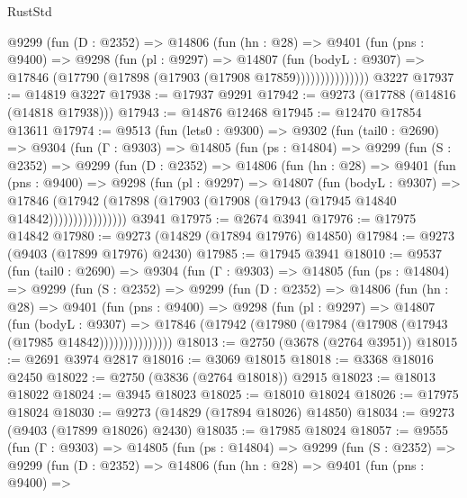 \begin{lexlean}{RustStd}
\begin{coremodule}
              @9299
                (fun (D : @2352) =>
                @14806
                  (fun (hn : @28) =>
                  @9401
                    (fun (pns : @9400) =>
                    @9298
                      (fun (pl : @9297) =>
                      @14807
                        (fun (bodyL : @9307) =>
                        @17846 (@17790 (@17898 (@17903 (@17908 @17859)))))))))))))))
    @3227
@17937 := @14819 @3227
@17938 := @17937 @9291
@17942 := @9273 (@17788 (@14816 (@14818 @17938)))
@17943 := @14876 @12468
@17945 := @12470 @17854 @13611
@17974 := @9513
    (fun (lets0 : @9300) =>
    @9302
      (fun (tail0 : @2690) =>
      @9304
        (fun (Γ : @9303) =>
        @14805
          (fun (ps : @14804) =>
          @9299
            (fun (S : @2352) =>
            @9299
              (fun (D : @2352) =>
              @14806
                (fun (hn : @28) =>
                @9401
                  (fun (pns : @9400) =>
                  @9298
                    (fun (pl : @9297) =>
                    @14807
                      (fun (bodyL : @9307) =>
                      @17846
                        (@17942
                          (@17898 (@17903 (@17908 (@17943 (@17945 @14840 @14842))))))))))))))))
    @3941
@17975 := @2674 @3941
@17976 := @17975 @14842
@17980 := @9273 (@14829 (@17894 @17976) @14850)
@17984 := @9273 (@9403 (@17899 @17976) @2430)
@17985 := @17945 @3941
@18010 := @9537
    (fun (tail0 : @2690) =>
    @9304
      (fun (Γ : @9303) =>
      @14805
        (fun (ps : @14804) =>
        @9299
          (fun (S : @2352) =>
          @9299
            (fun (D : @2352) =>
            @14806
              (fun (hn : @28) =>
              @9401
                (fun (pns : @9400) =>
                @9298
                  (fun (pl : @9297) =>
                  @14807
                    (fun (bodyL : @9307) =>
                    @17846 (@17942 (@17980 (@17984 (@17908 (@17943 (@17985 @14842)))))))))))))))
@18013 := @2750 (@3678 (@2764 @3951))
@18015 := @2691 @3974 @2817
@18016 := @3069 @18015
@18018 := @3368 @18016 @2450
@18022 := @2750 (@3836 (@2764 @18018)) @2915
@18023 := @18013 @18022
@18024 := @3945 @18023
@18025 := @18010 @18024
@18026 := @17975 @18024
@18030 := @9273 (@14829 (@17894 @18026) @14850)
@18034 := @9273 (@9403 (@17899 @18026) @2430)
@18035 := @17985 @18024
@18057 := @9555
    (fun (Γ : @9303) =>
    @14805
      (fun (ps : @14804) =>
      @9299
        (fun (S : @2352) =>
        @9299
          (fun (D : @2352) =>
          @14806
            (fun (hn : @28) =>
            @9401
              (fun (pns : @9400) =>

\end{coremodule}
\end{lexlean}
